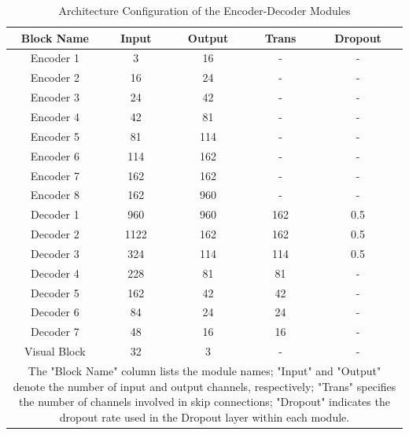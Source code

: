 \documentclass[a4paper, times, 10pt,twocolumn]{article}
\begin{document}
\begin{table}[h]
	\caption{Architecture Configuration of the Encoder-Decoder Modules}
	\label{tab:encoder_setting}
	\begin{tabular}{ccccc}
		\hline
		Block Name   & Input & Output & Trans & Dropout \\
		\hline
		Encoder 1    & 3     & 16     & -     & -       \\
		Encoder 2    & 16    & 24     & -     & -       \\
		Encoder 3    & 24    & 42     & -     & -       \\
		Encoder 4    & 42    & 81     & -     & -       \\
		Encoder 5    & 81    & 114    & -     & -       \\
		Encoder 6    & 114   & 162    & -     & -       \\
		Encoder 7    & 162   & 162    & -     & -       \\
		Encoder 8    & 162   & 960    & -     & -       \\
		Decoder 1    & 960   & 960    & 162   & 0.5     \\
		Decoder 2    & 1122  & 162    & 162   & 0.5     \\
		Decoder 3    & 324   & 114    & 114   & 0.5     \\
		Decoder 4    & 228   & 81     & 81    & -       \\
		Decoder 5    & 162   & 42     & 42    & -       \\
		Decoder 6    & 84    & 24     & 24    & -       \\
		Decoder 7    & 48    & 16     & 16    & -       \\
		Visual Block & 32    & 3      & -     & -       \\
		\hline
		\multicolumn{5}{p{244pt}}{The "Block Name" column lists the module names; "Input" and "Output" denote the number of input and output channels, respectively; "Trans" specifies the number of channels involved in skip connections; "Dropout" indicates the dropout rate used in the Dropout layer within each module.}
	\end{tabular}
\end{table}
\end{document}
